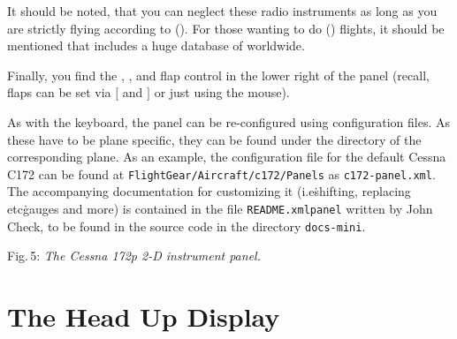 It should be noted, that you can neglect these radio instruments as
long as you are strictly flying according to  (). For those wanting to do  () flights, it should be mentioned that \FlightGear{}
includes a huge database of  worldwide.

Finally, you find the , , and flap
control in
the lower right of the panel (recall, flaps can be set via $[$ and $]$ or just
using the mouse).

As with the keyboard, the panel can be
re-configured using
configuration files. As these have to be plane specific, they can be found under
the
directory of the corresponding plane. As an example, the configuration file for
the
default Cessna C172 can be found at \texttt{FlightGear/Aircraft/c172/Panels} as
\texttt{c172-panel.xml}. The accompanying documentation for customizing it
(i.e\. shifting,
replacing etc\. gauges and more) is contained in the file
\texttt{README.xmlpanel}
written by John Check,
to be found in the source code in the directory \texttt{docs-mini}.

\medskip

\centerline{}

\smallskip
 \noindent
Fig.\,5: \textit{The Cessna 172p 2-D instrument panel.}
\medskip

\section{The Head Up Display}

